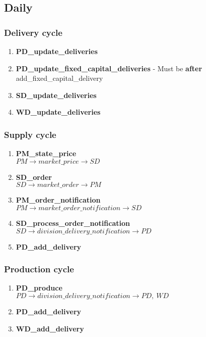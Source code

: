 \documentclass[11pt]{article}
\begin{document}
\subsection{Daily}

\subsubsection{Delivery cycle}
\begin{enumerate}
	\item \textbf{PD\_update\_deliveries}
	\item \textbf{PD\_update\_fixed\_capital\_deliveries} - Must be \textbf{after} add\_fixed\_capital\_delivery
	\item \textbf{SD\_update\_deliveries}
	\item \textbf{WD\_update\_deliveries}
\end{enumerate}

\subsubsection{Supply cycle}
\begin{enumerate}
	\item \textbf{PM\_state\_price} \\
	$ PM \rightarrow market\_price \rightarrow SD $
	\item \textbf{SD\_order} \\
	$ SD \rightarrow market\_order \rightarrow PM $
	\item \textbf{PM\_order\_notification} \\
	$ PM \rightarrow market\_order\_notification \rightarrow SD $
	\item \textbf{SD\_process\_order\_notification} \\
	$ SD \rightarrow division\_delivery\_notification \rightarrow PD $
	\item \textbf{PD\_add\_delivery}
		
\end{enumerate}

\subsubsection{Production cycle}
\begin{enumerate}
	\item \textbf{PD\_produce} \\
	$ PD \rightarrow division\_delivery\_notification \rightarrow PD,\ WD $
	\item \textbf{PD\_add\_delivery}
	\item \textbf{WD\_add\_delivery}
\end{enumerate}
\end{document}
